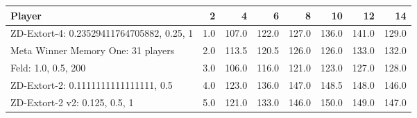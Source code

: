\begin{tabular}{lrrrrrrr}
\toprule
                                    Player &    2 &      4 &      6 &      8 &     10 &     12 &     14 \\
\midrule
 ZD-Extort-4: 0.23529411764705882, 0.25, 1 &  1.0 &  107.0 &  122.0 &  127.0 &  136.0 &  141.0 &  129.0 \\
        Meta Winner Memory One: 31 players &  2.0 &  113.5 &  120.5 &  126.0 &  126.0 &  133.0 &  132.0 \\
                       Feld: 1.0, 0.5, 200 &  3.0 &  106.0 &  116.0 &  121.0 &  123.0 &  127.0 &  128.0 \\
      ZD-Extort-2: 0.1111111111111111, 0.5 &  4.0 &  123.0 &  136.0 &  147.0 &  148.5 &  148.0 &  146.0 \\
             ZD-Extort-2 v2: 0.125, 0.5, 1 &  5.0 &  121.0 &  133.0 &  146.0 &  150.0 &  149.0 &  147.0 \\
\bottomrule
\end{tabular}
